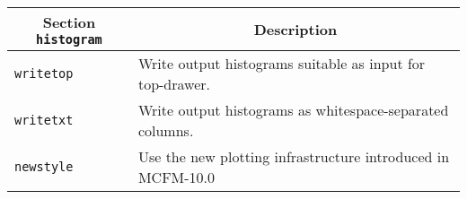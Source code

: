 	\begin{longtable}{p{1.5cm}p{12cm}}
		\toprule
		\multicolumn{1}{c}{{\textbf{Section} \texttt{histogram}}} & \multicolumn{1}{c}{{\textbf{Description}}} \\ 
		\midrule
		\texttt{writetop} & Write output histograms suitable as input for top-drawer. \\
		\texttt{writetxt} & Write output histograms as whitespace-separated columns. \\
		\texttt{newstyle} & Use the new plotting infrastructure introduced in MCFM-10.0\\
		\bottomrule
	\end{longtable}
